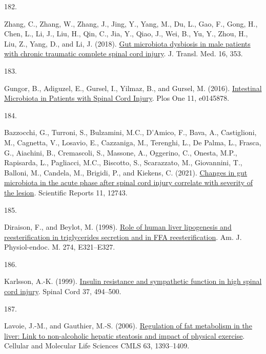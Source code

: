 \documentclass[
]{article}
\newlength{\cslhangindent}
\newlength{\csllabelwidth}
\newlength{\cslentryspacingunit} %
\newenvironment{CSLReferences}[2] %
 {%
  \setlength{\parindent}{0pt}
  \ifodd #1
  \let\oldpar\par
  \def\par{\hangindent=\cslhangindent\oldpar}
  \fi
  \setlength{\parskip}{#2\cslentryspacingunit}
 }%
 {}
\newcommand{\CSLLeftMargin}[1]{\parbox[t]{\csllabelwidth}{#1}}
\newcommand{\CSLRightInline}[1]{\parbox[t]{\linewidth - \csllabelwidth}{#1}\break}
\begin{document}
\begin{CSLReferences}{0}{0}
\leavevmode{}%
\CSLLeftMargin{182. }
\CSLRightInline{Zhang, C., Zhang, W., Zhang, J., Jing, Y., Yang, M., Du, L., Gao, F., Gong, H., Chen, L., Li, J., Liu, H., Qin, C., Jia, Y., Qiao, J., Wei, B., Yu, Y., Zhou, H., Liu, Z., Yang, D., and Li, J. (2018). \href{https://doi.org/10.1186/s12967-018-1735-9}{Gut microbiota dysbiosis in male patients with chronic traumatic complete spinal cord injury}. J. Transl. Med. 16, 353.}

\leavevmode{}%
\CSLLeftMargin{183. }
\CSLRightInline{Gungor, B., Adiguzel, E., Gursel, I., Yilmaz, B., and Gursel, M. (2016). \href{https://doi.org/10.1371/journal.pone.0145878}{Intestinal {Microbiota} in {Patients} with {Spinal Cord Injury}}. Plos One 11, e0145878.}

\leavevmode{}%
\CSLLeftMargin{184. }
\CSLRightInline{Bazzocchi, G., Turroni, S., Bulzamini, M.C., D'Amico, F., Bava, A., Castiglioni, M., Cagnetta, V., Losavio, E., Cazzaniga, M., Terenghi, L., De Palma, L., Frasca, G., Aiachini, B., Cremascoli, S., Massone, A., Oggerino, C., Onesta, M.P., Rapisarda, L., Pagliacci, M.C., Biscotto, S., Scarazzato, M., Giovannini, T., Balloni, M., Candela, M., Brigidi, P., and Kiekens, C. (2021). \href{https://doi.org/10.1038/s41598-021-92027-z}{Changes in gut microbiota in the acute phase after spinal cord injury correlate with severity of the lesion}. Scientific Reports 11, 12743.}

\leavevmode{}%
\CSLLeftMargin{185. }
\CSLRightInline{Diraison, F., and Beylot, M. (1998). \href{https://doi.org/10.1152/ajpendo.1998.274.2.E321}{Role of human liver lipogenesis and reesterification in triglycerides secretion and in {FFA} reesterification}. Am. J. Physiol-endoc. M. 274, E321--E327.}

\leavevmode{}%
\CSLLeftMargin{186. }
\CSLRightInline{Karlsson, A.-K. (1999). \href{https://doi.org/10.1038/sj.sc.3100844}{Insulin resistance and sympathetic function in high spinal cord injury}. Spinal Cord 37, 494--500.}

\leavevmode{}%
\CSLLeftMargin{187. }
\CSLRightInline{Lavoie, J.-M., and Gauthier, M.-S. (2006). \href{https://doi.org/10.1007/s00018-006-6600-y}{Regulation of fat metabolism in the liver: Link to non-alcoholic hepatic steatosis and impact of physical exercise}. Cellular and Molecular Life Sciences CMLS 63, 1393--1409.}


\end{CSLReferences}
\end{document}
